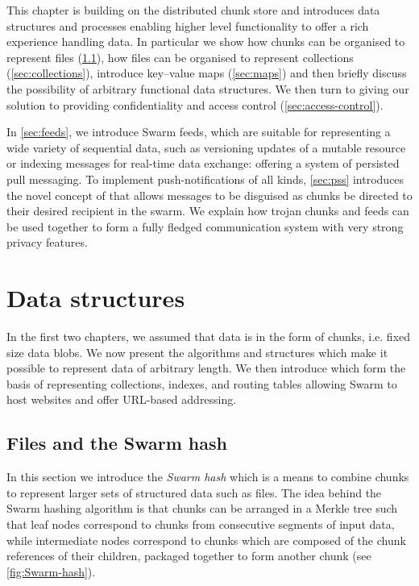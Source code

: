 This chapter is building on the distributed chunk store and introduces data structures and processes enabling higher level functionality to offer a rich experience handling data. In particular we show how chunks can be organised to represent files (\ref{sec:files}), how files can be organised to represent collections (\ref{sec:collections}), introduce key--value maps (\ref{sec:maps}) and then briefly discuss the possibility of arbitrary functional data structures. We then turn to giving our solution to providing confidentiality and access control (\ref{sec:access-control}). 

In \ref{sec:feeds}, we introduce Swarm feeds, which are suitable for representing a wide variety of sequential data, such as versioning updates of a mutable resource or indexing messages for real-time data exchange: offering a system of persisted pull messaging. To implement push-notifications of all kinds, \ref{sec:pss} introduces the novel concept of  that allows messages to be disguised as chunks be directed to their desired recipient in the swarm. We explain how trojan chunks and feeds can be used together to form a fully fledged communication system with very strong privacy features.                                                       

\section{Data structures\statusgreen}\label{sec:datastructures}

\green{}

In the first two chapters, we assumed that data is in the form of chunks, i.e. fixed size data blobs. We now present the algorithms and structures which make it possible to represent data of arbitrary length. We then introduce  which form the basis of representing collections, indexes, and routing tables allowing Swarm to host websites and offer URL-based addressing.

\subsection{Files and the Swarm hash\statusgreen}\label{sec:files}

In this section we introduce the \emph{Swarm hash} which is a means to combine chunks to represent larger sets of structured data such as files. The idea behind the Swarm hashing algorithm is that chunks can be arranged in a Merkle tree such that leaf nodes correspond to chunks from consecutive segments of input data, while intermediate nodes correspond to chunks which are composed of the chunk references of their children,  packaged together to form another chunk (see \ref{fig:Swarm-hash}). 



